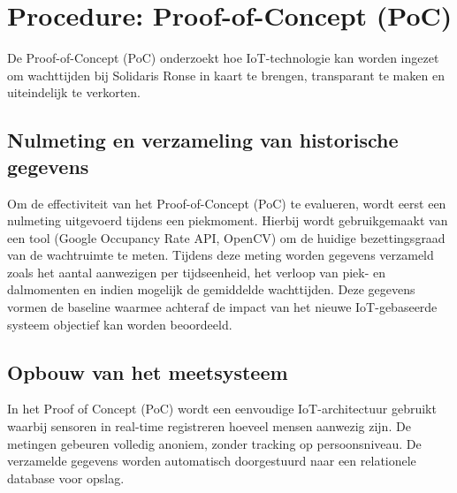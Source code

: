 

\section{Procedure: Proof-of-Concept (PoC)}
De Proof-of-Concept (PoC) onderzoekt hoe IoT-technologie kan worden ingezet om wachttijden bij Solidaris Ronse in kaart te brengen, transparant te maken en uiteindelijk te verkorten.

\subsection{Nulmeting en verzameling van historische gegevens}
Om de effectiviteit van het Proof-of-Concept (PoC) te evalueren, wordt eerst een nulmeting uitgevoerd tijdens een piekmoment. Hierbij wordt gebruikgemaakt van een tool (Google Occupancy Rate API, OpenCV) om de huidige bezettingsgraad van de wachtruimte te meten. Tijdens deze meting worden gegevens verzameld zoals het aantal aanwezigen per tijdseenheid, het verloop van piek- en dalmomenten en indien mogelijk de gemiddelde wachttijden. Deze gegevens vormen de baseline waarmee achteraf de impact van het nieuwe IoT-gebaseerde systeem objectief kan worden beoordeeld.

\subsection{Opbouw van het meetsysteem}
In het Proof of Concept (PoC) wordt een eenvoudige IoT-architectuur gebruikt waarbij sensoren in real-time registreren hoeveel mensen aanwezig zijn. De metingen gebeuren volledig anoniem, zonder tracking op persoonsniveau. De verzamelde gegevens worden automatisch doorgestuurd naar een relationele database voor opslag. 

